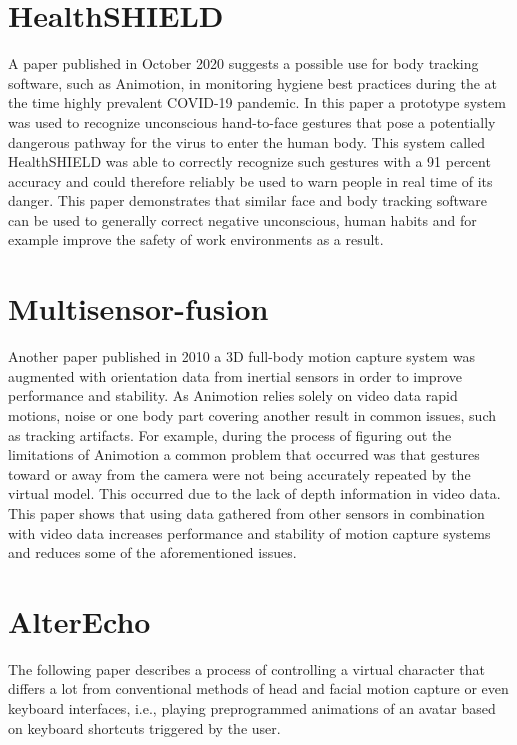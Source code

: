 \section{HealthSHIELD}
A paper published in October 2020 suggests a possible use for body tracking software, such as Animotion, in monitoring hygiene best practices during the at the time highly 
prevalent COVID-19 pandemic. In this paper a prototype system was used to recognize unconscious hand-to-face gestures that pose a potentially dangerous pathway for the virus
to enter the human body. This system called HealthSHIELD was able to correctly recognize such gestures with a 91 percent accuracy and could therefore reliably be used to warn
people in real time of its danger. This paper demonstrates that similar face and body tracking software can be used to generally correct negative unconscious, human habits
and for example improve the safety of work environments as a result. \cite{HealthSHIELD}

\section{Multisensor-fusion}
Another paper published in 2010 a 3D full-body motion capture system was augmented with orientation data from inertial sensors in order to improve performance and stability.
As Animotion relies solely on video data rapid motions, noise or one body part covering another result in common issues, such as tracking artifacts. For example, during the
process of figuring out the limitations of Animotion a common problem that occurred was that gestures toward or away from the camera were not being accurately repeated by the
virtual model. This occurred due to the lack of depth information in video data. This paper shows that using data gathered from other sensors in combination with video data
increases performance and stability of motion capture systems and reduces some of the aforementioned issues. \cite{Multisensor-fusion}

\section{AlterEcho}
The following paper describes a process of controlling a virtual character that differs a lot from conventional methods of head and facial motion capture or even keyboard
interfaces, i.e., playing preprogrammed animations of an avatar based on keyboard shortcuts triggered by the user. \cite{AlterEcho}

